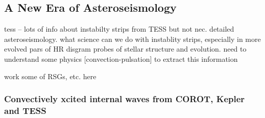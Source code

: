 {\color{blue}
\subsection{A New Era of Asteroseismology}

tess -- lots of info about instabilty strips from TESS but not nec. detailed asteroseismology.  what science can we do with instablity strips, especially in more evolved pars of HR disgram  probes of stellar structure and evolution.   need to understand some physics [convection-pulsation] to extract this information

work some of RSGs, etc. here

\subsubsection{Convectively xcited internal waves from COROT, Kepler and TESS}


}
